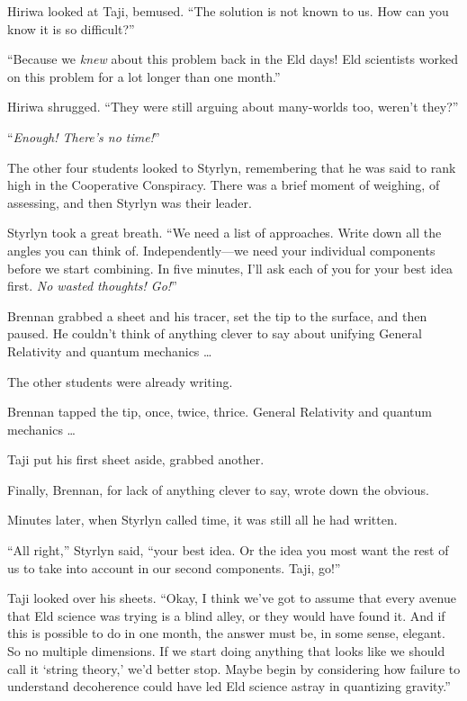 {
 Hiriwa looked at Taji, bemused. ``The solution is
not known to us. How can you know it is so
difficult?''}

{
 ``Because we \textit{knew} about this problem
back in the Eld days! Eld scientists worked on this problem for a lot
longer than one month.''}

{
 Hiriwa shrugged. ``They were still arguing about
many-worlds too, weren't they?''}

{
 ``\textit{Enough! There's no
time!}''}

{
 The other four students looked to Styrlyn, remembering that he was
said to rank high in the Cooperative Conspiracy. There was a brief
moment of weighing, of assessing, and then Styrlyn was their leader.}

{
 Styrlyn took a great breath. ``We need a list of
approaches. Write down all the angles you can think of.
Independently---we need your individual components before we start
combining. In five minutes, I'll ask each of you for
your best idea first. \textit{No wasted thoughts!
Go!}''}

{
 Brennan grabbed a sheet and his tracer, set the tip to the
surface, and then paused. He couldn't think of anything
clever to say about unifying General Relativity and quantum mechanics
\ldots}

{
 The other students were already writing.}

{
 Brennan tapped the tip, once, twice, thrice. General Relativity
and quantum mechanics \ldots}

{
 Taji put his first sheet aside, grabbed another.}

{
 Finally, Brennan, for lack of anything clever to say, wrote down
the obvious.}

{
 Minutes later, when Styrlyn called time, it was still all he had
written.}

{
 ``All right,'' Styrlyn said,
``your best idea. Or the idea you most want the rest
of us to take into account in our second components. Taji,
go!''}

{
 Taji looked over his sheets. ``Okay, I think
we've got to assume that every avenue that Eld science
was trying is a blind alley, or they would have found it. And if this
is possible to do in one month, the answer must be, in some sense,
elegant. So no multiple dimensions. If we start doing anything that
looks like we should call it `string
theory,' we'd better stop. Maybe begin
by considering how failure to understand decoherence could have led Eld
science astray in quantizing gravity.''}


